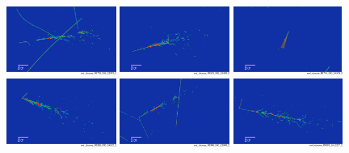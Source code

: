 \begin{figure}
    \includegraphics[width=0.32\textwidth]{Sidebands/Figures/nuecc/evd/1e0p_a.png}
    \includegraphics[width=0.32\textwidth]{Sidebands/Figures/nuecc/evd/1e0p_b.png}
    \includegraphics[width=0.32\textwidth]{Sidebands/Figures/nuecc/evd/1e0p_c.png} \\
    
    \includegraphics[width=0.32\textwidth]{Sidebands/Figures/nuecc/evd/1e1p_d.png}
    \includegraphics[width=0.32\textwidth]{Sidebands/Figures/nuecc/evd/1e1p_e.png}
    \includegraphics[width=0.32\textwidth]{Sidebands/Figures/nuecc/evd/1e1p_a.png}\\
    

\end{figure}
